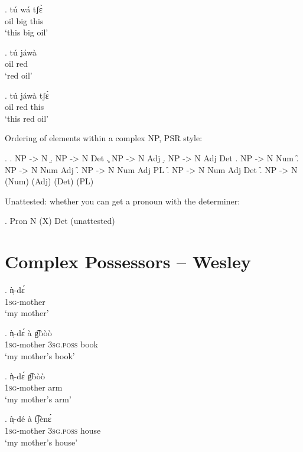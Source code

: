 \documentclass{assets/fieldnotes}
\begin{document}
\exg.
tú    wá    tʃɛ̀  \\
oil   big   this \\%
`this big oil'

\exg.
tú    jáwà \\
oil   red  \\%
`red oil'

\exg.
tú    jáwà   tʃɛ̀  \\
oil   red    this \\%
`this red oil'

Ordering of elements within a complex NP, PSR style:

\ex.
\a. NP -> N 
\b. NP -> N Det
\c. NP -> N Adj
\d. NP -> N Adj Det
\e. NP -> N Num
\f. NP -> N Num Adj
\f. NP -> N Num Adj PL
\f. NP -> N Num Adj Det
\f. NP -> N (Num) (Adj) (Det) (PL)

Unattested: whether you can get a pronoun with the determiner:

\ex. Pron N (X) Det (unattested)



\section{Complex Possessors -- Wesley} 

\exg. ǹ̩-dɛ́\\
\textsc{1sg}-mother\\
`my mother'

\exg. ǹ̩-dɛ́ à g͡bòò\\
\textsc{1sg}-mother \textsc{3sg.poss} book\\
`my mother’s book'

\exg. ǹ̩-dɛ́ g͡bòò\\
\textsc{1sg}-mother arm\\
`my mother’s arm'



\exg. ǹ̩-dé à t͡ʃènɛ́\\
\textsc{1sg}-mother \textsc{3sg.poss} house\\
`my mother’s house'
\end{document}
